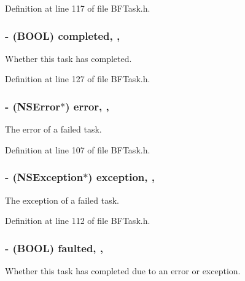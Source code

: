 Definition at line 117 of file B\+F\+Task.\+h.

\hypertarget{interface_b_f_task_a8c0d88b65b10e8f6dd5378ad3d9bc6c3}{}
\subsubsection[{completed}]{\setlength{\rightskip}{0pt plus 5cm}-\/ (B\+O\+O\+L) completed\hspace{0.3cm}{\ttfamily [read]}, {\ttfamily [nonatomic]}, {\ttfamily [assign]}}\label{interface_b_f_task_a8c0d88b65b10e8f6dd5378ad3d9bc6c3}
Whether this task has completed. 

Definition at line 127 of file B\+F\+Task.\+h.

\hypertarget{interface_b_f_task_a9e3b5f8fc6e1754500bc7241a04c2cc6}{}
\subsubsection[{error}]{\setlength{\rightskip}{0pt plus 5cm}-\/ (N\+S\+Error$\ast$) error\hspace{0.3cm}{\ttfamily [read]}, {\ttfamily [nonatomic]}, {\ttfamily [strong]}}\label{interface_b_f_task_a9e3b5f8fc6e1754500bc7241a04c2cc6}
The error of a failed task. 

Definition at line 107 of file B\+F\+Task.\+h.

\hypertarget{interface_b_f_task_ab21a391a52929bd83d374c32c1b54ebf}{}
\subsubsection[{exception}]{\setlength{\rightskip}{0pt plus 5cm}-\/ (N\+S\+Exception$\ast$) exception\hspace{0.3cm}{\ttfamily [read]}, {\ttfamily [nonatomic]}, {\ttfamily [strong]}}\label{interface_b_f_task_ab21a391a52929bd83d374c32c1b54ebf}
The exception of a failed task. 

Definition at line 112 of file B\+F\+Task.\+h.

\hypertarget{interface_b_f_task_a8b36396022612bbb109bb26e097874be}{}
\subsubsection[{faulted}]{\setlength{\rightskip}{0pt plus 5cm}-\/ (B\+O\+O\+L) faulted\hspace{0.3cm}{\ttfamily [read]}, {\ttfamily [nonatomic]}, {\ttfamily [assign]}}\label{interface_b_f_task_a8b36396022612bbb109bb26e097874be}
Whether this task has completed due to an error or exception. 

